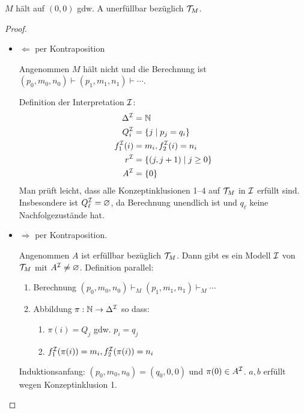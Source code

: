 \begin{lemma}
    $M$ hält auf $(0, 0)$ gdw. A unerfüllbar bezüglich $\mathcal{T}_M$.
\end{lemma}

\begin{tafel}\mbox{}
    \begin{proof}\mbox{}
    \begin{itemize}
        \item $\Leftarrow$ per Kontraposition

            Angenommen $M$ hält nicht und die Berechnung ist $(p_0, m_0, n_0) \vdash (p_1, m_1, n_1) \vdash \cdots$.

            Definition der Interpretation $\mathcal{I}$:
            \begin{align*}
                \Delta^{\mathcal{I}} &= \mathbb{N}\\
                Q^{\mathcal{I}}_i &= \{ j \mid p_j = q_i\}\\
                f^{\mathcal{I}}_1(i) &= m_i, f^{\mathcal{I}}_2(i) = n_i\\
                r^{\mathcal{I}} &= \{(j, j + 1) \mid j \geq 0\}\\
                A^{\mathcal{I}} &= \{0\}
            \end{align*}
            Man prüft leicht, dass alle Konzeptinklusionen 1--4 auf $\mathcal{T}_M$ in $\mathcal{I}$ erfüllt sind. Insbesondere ist $Q^{\mathcal{I}}_\ell = \varnothing$, da Berechnung unendlich ist und $q_\ell$ keine Nachfolgezustände hat.
        \item $\Rightarrow$ per Kontraposition.

            Angenommen $A$ ist erfüllbar bezüglich $\mathcal{T}_M$. Dann gibt es ein Modell $\mathcal{I}$ von $\mathcal{T}_M$ mit $A^{\mathcal{I}} \neq \varnothing$.
            Definition parallel:
            \begin{enumerate}
                \item Berechnung $(p_0, m_0, n_0) \vdash_M (p_1, m_1, n_1) \vdash_M \cdots$
                \item Abbildung $\pi: \mathbb{N} \rightarrow \Delta^{\mathcal{I}}$ so dass:
                    \begin{enumerate}
                        \item $\pi(i) = Q_j$ gdw. $p_i = q_j$
                        \item $f^{\mathcal{I}}_1(\pi(i)) = m_i, f^{\mathcal{I}}_2(\pi(i)) = n_i$
                    \end{enumerate}
            \end{enumerate}
            Induktionsanfang: $(p_0, m_0, n_0) = (q_0, 0, 0)$ und $\pi(0) \in A^{\mathcal{I}}$. $a, b$ erfüllt wegen Konzeptinklusion 1.


\end{itemize}
\end{proof}
\end{tafel}
